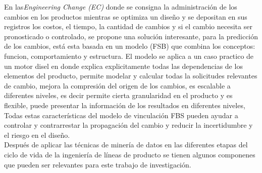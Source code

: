   En las\textit{Engineering Change (EC)} donde se consigna la administración de los cambios en los productos mientras se optimiza un diseño y se depositan en sus registros los costos, el tiempo, la cantidad de cambios y si el cambio necesita ser pronosticado o controlado, se propone una solución interesante\cite{Hamraz2012}, para la predicción de los cambios, está esta basada en un modelo (FSB) que combina los conceptos: funcion, comportamiento y estructura. El modelo se aplica a un caso practico de un motor disel en donde explica explicitamente todas las dependencias de los elementos del producto, permite modelar y calcular todas la solicitudes relevantes de cambio, mejora la compresión del origen de los cambios, es escalable a diferentes niveles, es decir permite cierta granularidad en el producto y es flexible, puede presentar la información de los resultados en diferentes niveles, Todas estas características del modelo de vinculación FBS pueden ayudar a controlar y contrarrestar la propagación del cambio y reducir la incertidumbre y el riesgo en el diseño.\\
Después de aplicar las técnicas de minería de datos en las diferentes etapas del ciclo de vida de la ingeniería de líneas de producto se tienen algunos componenes que pueden ser relevantes para este trabajo de investigación.

